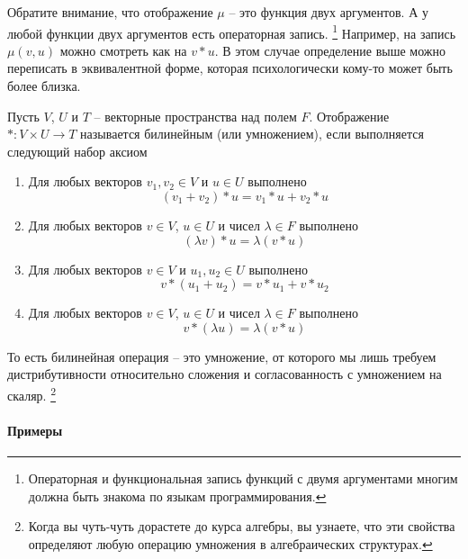 Обратите внимание, что отображение $\mu$ -- это функция двух аргументов.
А у любой функции двух аргументов есть операторная запись.%
\footnote{Операторная и функциональная запись функций с двумя аргументами многим должна быть знакома по языкам программирования.}
Например, на запись $\mu(v, u) $ можно смотреть как на $v * u$.
В этом случае определение выше можно переписать в эквивалентной форме, которая психологически кому-то может быть более близка.
\begin{definition}
Пусть $V$, $U$ и $T$ -- векторные пространства над полем $F$.
Отображение $*\colon V\times U \to T$ называется билинейным (или умножением), если выполняется следующий набор аксиом
\begin{enumerate}
\item Для любых векторов $v_1,v_2\in V$ и $u\in U$ выполнено
\[
(v_1 + v_2) * u = v_1 * u + v_2 * u
\]

\item Для любых векторов $v\in V$, $u\in U$ и чисел $\lambda \in F$ выполнено
\[
(\lambda v)*u = \lambda (v * u)
\]

\item Для любых векторов $v\in V$ и $u_1,u_2\in U$ выполнено
\[
v * (u_1 + u_2) = v * u_1 + v * u_2
\]

\item Для любых векторов $v\in V$, $u\in U$ и чисел $\lambda \in F$ выполнено
\[
v *(\lambda u) = \lambda (v * u)
\]
\end{enumerate}
\end{definition}
То есть билинейная операция -- это умножение, от которого мы лишь требуем дистрибутивности относительно сложения и согласованность с умножением на скаляр.%
\footnote{Когда вы чуть-чуть дорастете до курса алгебры, вы узнаете, что эти свойства определяют любую операцию умножения в алгебраических структурах.}

\paragraph{Примеры}

